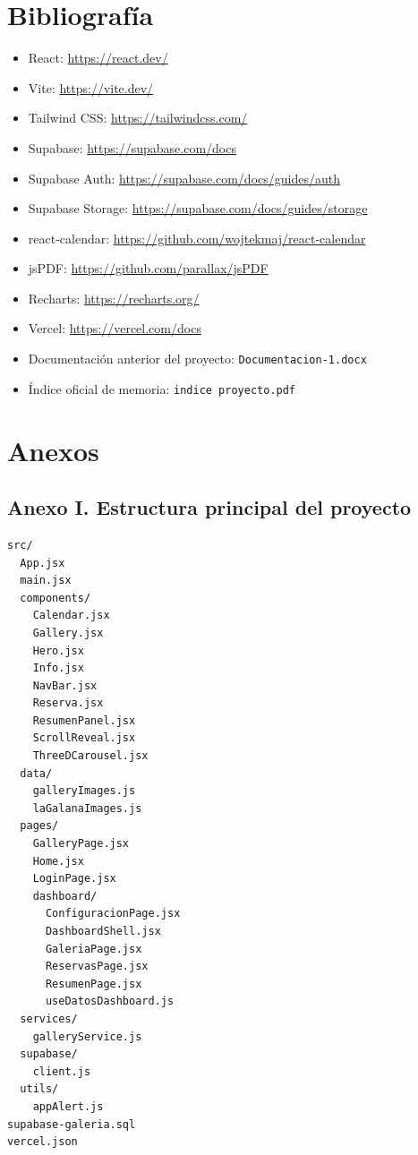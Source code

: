 \documentclass[11pt,a4paper]{article}
\begin{document}
\section{Bibliografía}
\begin{itemize}[leftmargin=1.4cm]
  \item React: \url{https://react.dev/}
  \item Vite: \url{https://vite.dev/}
  \item Tailwind CSS: \url{https://tailwindcss.com/}
  \item Supabase: \url{https://supabase.com/docs}
  \item Supabase Auth: \url{https://supabase.com/docs/guides/auth}
  \item Supabase Storage: \url{https://supabase.com/docs/guides/storage}
  \item react-calendar: \url{https://github.com/wojtekmaj/react-calendar}
  \item jsPDF: \url{https://github.com/parallax/jsPDF}
  \item Recharts: \url{https://recharts.org/}
  \item Vercel: \url{https://vercel.com/docs}
  \item Documentación anterior del proyecto: \texttt{Documentacion-1.docx}
  \item Índice oficial de memoria: \texttt{indice proyecto.pdf}
\end{itemize}

\section{Anexos}

\subsection{Anexo I. Estructura principal del proyecto}
\begin{verbatim}
src/
  App.jsx
  main.jsx
  components/
    Calendar.jsx
    Gallery.jsx
    Hero.jsx
    Info.jsx
    NavBar.jsx
    Reserva.jsx
    ResumenPanel.jsx
    ScrollReveal.jsx
    ThreeDCarousel.jsx
  data/
    galleryImages.js
    laGalanaImages.js
  pages/
    GalleryPage.jsx
    Home.jsx
    LoginPage.jsx
    dashboard/
      ConfiguracionPage.jsx
      DashboardShell.jsx
      GaleriaPage.jsx
      ReservasPage.jsx
      ResumenPage.jsx
      useDatosDashboard.js
  services/
    galleryService.js
  supabase/
    client.js
  utils/
    appAlert.js
supabase-galeria.sql
vercel.json
\end{verbatim}
\end{document}
